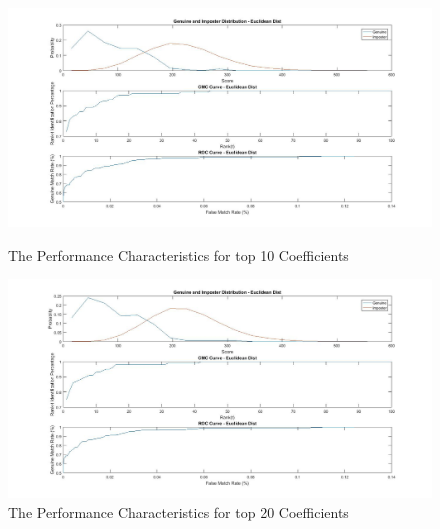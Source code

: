 \documentclass[conference]{IEEEtran}
\begin{document}
\begin{enumerate}
\begin{figure}
\centering
\includegraphics[width=20cm]{forTop10Coeffecients.jpg}
\caption{The Performance Characteristics for top 10 Coefficients}
\label{top10Coef}
\includegraphics[width=20cm]{forTop20Coeffecients.jpg}
\caption{The Performance Characteristics for top 20 Coefficients}
\label{top20Coef}
\end{figure}



\end{enumerate}
\end{document}
